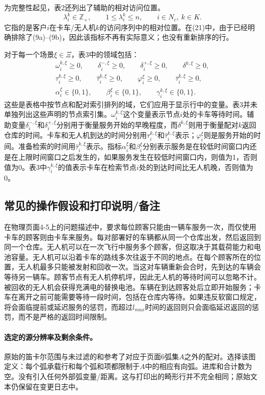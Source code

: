 \documentclass[10pt]{article}
\begin{document}
为完整性起见，表2还列出了辅助的相对访问位置。
\[
\lambda_i^k\in\mathbb Z_+,\qquad 1\leq\lambda_i^k\leq n,
\qquad i\in N_c,\ k\in K.
\]
它指的是客户$i$在卡车/无人机$k$的访问序列中的相对位置。在(21)中，由于已经明确排除了(9a)--(9b)，因此该指标不再有实际意义；也没有重新排序的行。

对于每一个场景$\xi\in\Xi$，表3中的领域包括：
\[
\begin{gathered}
\omega_i^{k,\xi}\geq0,\qquad
\delta_i^{-,\xi}\geq0,\qquad\delta_i^{+,\xi}\geq0,\qquad\delta^{k,\xi}\geq0,\\
\tau_i^{k,\xi}\geq0,\qquad\hat\tau_i^{k,\xi}\geq0,\qquad
\varphi_i^\xi\geq0,\qquad\bar\tau_i^{k,\xi}\geq0,\\
\alpha_i^\xi\in\{0,1\},\qquad\beta_i^\xi\in\{0,1\},\qquad
\gamma_i^{k,\xi}\in\{0,1\}.
\end{gathered}
\]
这些是表格中按节点和配对索引排列的域，它们应用于显示行中的变量。表3并未单独列出这些声明的节点索引集。$\omega_i^{k,\xi}$这个变量表示节点$i$处的卡车等待时间。辅助变量$\delta_i^{-,\xi}$和$\delta_i^{+,\xi}$分别用于衡量服务开始的早晚程度，而$\delta^{k,\xi}$则用于衡量配对$k$返回仓库的时间。卡车和无人机到达的时间分别用$\tau_i^{k,\xi}$和$\hat\tau_i^{k,\xi}$表示；$\varphi_i^\xi$则是服务开始的时间。准备检索的时间用$\bar\tau_i^{k,\xi}$表示。指标$\alpha_i^\xi$和$\beta_i^\xi$分别表示服务是在较低时间窗口内还是在上限时间窗口之后发生的，如果服务发生在较低时间窗口内，则值为1，否则值为0。表3中$\gamma_i^{k,\xi}$的值表示卡车在检索节点$i$处的到达时间比无人机晚，否则值为0。

\subsection*{常见的操作假设和打印说明/备注}
在物理页面4-5上的问题描述中，要求每位顾客只能由一辆车服务一次，而仅使用卡车的顾客则由卡车来服务。每对部署好的车辆都从同一个仓库出发，然后返回到同一个仓库。无人机可以在一次飞行中服务多个顾客，但这取决于其载荷能力和电池容量。无人机可以沿着卡车的路线多次往返于不同的地点。在每个顾客所在的位置，无人机最多只能被发射和回收一次。当这对车辆重新会合时，先到达的车辆会等待另一辆车。顾客节点有无人机停机坪，因此无人机的等待时间可以忽略不计。被回收的无人机会获得充满电的替换电池。车辆在到达顾客处后立即开始服务；卡车在离开之前可能需要等待一段时间，包括在仓库内等待。如果违反软窗口规定，将会面临提前或延迟服务的惩罚，而超过$l_{max}$时间的返回则只会面临延迟返回的惩罚，而不是严格的返回时间限制。

\paragraph{选定的源分辨率及剩余条件。}
原始的笛卡尔范围与未过滤的和参考了对应于页面6弧集$A$之外的配对。选择该图定义：每个弧承载行和每个弧和项都限制于$A$中的相应有向弧。进库和合计数为空。没有引入任何外部弧变量/距离。这与打印出的畸形行并不完全相同；原始文本仍保留在变更日志中。
\end{document}
